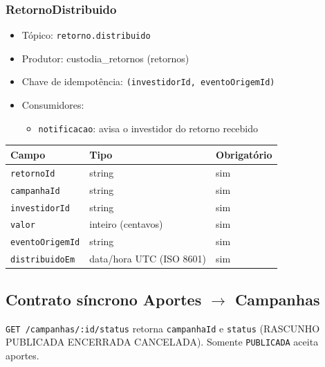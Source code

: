 \subsubsection{RetornoDistribuido}
\begin{itemize}
  \item Tópico: \texttt{retorno.distribuido}
  \item Produtor: custodia\_retornos (retornos)
  \item Chave de idempotência: \texttt{(investidorId, eventoOrigemId)}
  \item Consumidores:
  \begin{itemize}
    \item \texttt{notificacao}: avisa o investidor do retorno recebido
  \end{itemize}
\end{itemize}
\begin{tabular}{lll}
\hline
Campo & Tipo & Obrigatório \\
\hline
\texttt{retornoId} & string & sim \\
\texttt{campanhaId} & string & sim \\
\texttt{investidorId} & string & sim \\
\texttt{valor} & inteiro (centavos) & sim \\
\texttt{eventoOrigemId} & string & sim \\
\texttt{distribuidoEm} & data/hora UTC (ISO 8601) & sim \\
\hline
\end{tabular}

\subsection{Contrato síncrono Aportes $\rightarrow$ Campanhas}
\texttt{GET /campanhas/:id/status} retorna \texttt{campanhaId} e \texttt{status} (RASCUNHO \textbar{} PUBLICADA \textbar{} ENCERRADA \textbar{} CANCELADA). Somente \texttt{PUBLICADA} aceita aportes.

